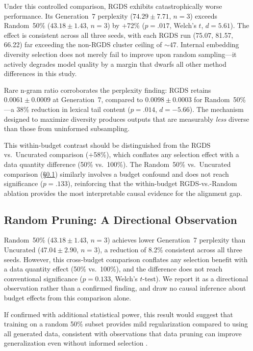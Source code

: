 Under this controlled comparison, RGDS exhibits catastrophically worse performance. Its Generation~7 perplexity ($74.29 \pm 7.71$, $n{=}3$) exceeds Random~50\% ($43.18 \pm 1.43$, $n{=}3$) by $+$72\% ($p = .017$, Welch's $t$, $d = 5.61$). The effect is consistent across all three seeds, with each RGDS run (75.07, 81.57, 66.22) far exceeding the non-RGDS cluster ceiling of ${\sim}47$. Internal embedding diversity selection does not merely fail to improve upon random sampling---it actively degrades model quality by a margin that dwarfs all other method differences in this study.

Rare n-gram ratio corroborates the perplexity finding: RGDS retains $0.0061 \pm 0.0009$ at Generation~7, compared to $0.0098 \pm 0.0003$ for Random~50\%---a 38\% reduction in lexical tail content ($p = .014$, $d = -5.66$). The mechanism designed to maximize diversity produces outputs that are measurably \emph{less} diverse than those from uninformed subsampling.

This within-budget contrast should be distinguished from the RGDS vs.\ Uncurated comparison ($+$58\%), which conflates any selection effect with a data quantity difference (50\% vs.\ 100\%). The Random~50\% vs.\ Uncurated comparison (\S\ref{sec:result_s3}) similarly involves a budget confound and does not reach significance ($p = .133$), reinforcing that the within-budget RGDS-vs.-Random ablation provides the most interpretable causal evidence for the alignment gap.

\subsection{Random Pruning: A Directional Observation}
\label{sec:result_s3}

Random~50\% ($43.18 \pm 1.43$, $n{=}3$) achieves lower Generation~7 perplexity than Uncurated ($47.04 \pm 2.90$, $n{=}3$), a reduction of 8.2\% consistent across all three seeds. However, this cross-budget comparison conflates any selection benefit with a data quantity effect (50\% vs.\ 100\%), and the difference does not reach conventional significance ($p = 0.133$, Welch's $t$-test). We report it as a directional observation rather than a confirmed finding, and draw no causal inference about budget effects from this comparison alone.

If confirmed with additional statistical power, this result would suggest that training on a random 50\% subset provides mild regularization compared to using all generated data, consistent with observations that data pruning can improve generalization even without informed selection \citep{sorscher2022beyond}.

